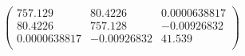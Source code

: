 \documentclass{article}
\begin{document}
\[\left(
\begin{array}{ccc}
 757.129 & 80.4226 & 0.0000638817 \\
 80.4226 & 757.128 & -0.00926832 \\
 0.0000638817 & -0.00926832 & 41.539 \\
\end{array}
\right)\]
\end{document}
